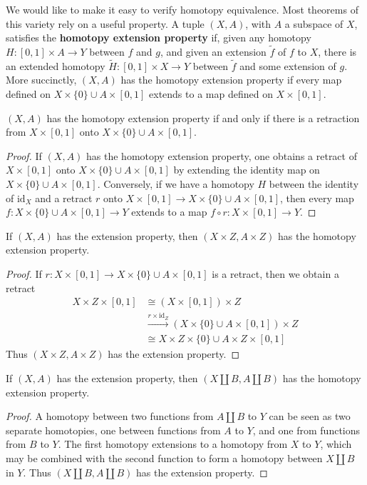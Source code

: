 We would like to make it easy to verify homotopy equivalence. Most theorems of this variety rely on a useful property. A tuple $(X,A)$, with $A$ a subspace of $X$, satisfies the {\bf homotopy extension property} if, given any homotopy $H: [0,1] \times A \to Y$ between $f$ and $g$, and given an extension $\tilde{f}$ of $f$ to $X$, there is an extended homotopy $\widetilde{H}: [0,1] \times X \to Y$ between $\tilde{f}$ and some extension of $g$. More succinctly, $(X,A)$ has the homotopy extension property if every map defined on $X \times \{ 0 \} \cup A \times [0,1]$ extends to a map defined on $X \times [0,1]$.

\begin{lemma}
    $(X,A)$ has the homotopy extension property if and only if there is a retraction from $X \times [0,1]$ onto $X \times \{ 0 \} \cup A \times [0,1]$.
\end{lemma}
\begin{proof}
    If $(X,A)$ has the homotopy extension property, one obtains a retract of $X \times [0,1]$ onto $X \times \{ 0 \} \cup A \times [0,1]$ by extending the identity map on $X \times \{ 0 \} \cup A \times [0,1]$. Conversely, if we have a homotopy $H$ between the identity of $\text{id}_X$ and a retract $r$ onto $X \times [0,1] \to X \times \{ 0 \} \cup A \times [0,1]$, then every map $f: X \times \{ 0 \} \cup A \times [0,1] \to Y$ extends to a map $f \circ r: X \times [0,1] \to Y$.
\end{proof}

\begin{corollary}
    If $(X,A)$ has the extension property, then $(X \times Z, A \times Z)$ has the homotopy extension property.
\end{corollary}
\begin{proof}
    If $r: X \times [0,1] \to X \times \{ 0 \} \cup A \times [0,1]$ is a retract, then we obtain a retract
    \begin{align*}
        X \times Z \times [0,1] &\cong (X \times [0,1]) \times Z\\
        &\xrightarrow{r \times \text{id}_Z} (X \times \{ 0 \} \cup A \times [0,1]) \times Z\\
        &\cong X \times Z \times \{ 0 \} \cup A \times Z \times [0,1]
    \end{align*}
    Thus $(X \times Z, A \times Z)$ has the extension property.
\end{proof}

\begin{corollary}
    If $(X,A)$ has the extension property, then $(X \coprod B, A \coprod B)$ has the homotopy extension property.
\end{corollary}
\begin{proof}
    A homotopy between two functions from $A \coprod B$ to $Y$ can be seen as two separate homotopies, one between functions from $A$ to $Y$, and one from functions from $B$ to $Y$. The first homotopy extensions to a homotopy from $X$ to $Y$, which may be combined with the second function to form a homotopy between $X \coprod B$ in $Y$. Thus $(X \coprod B, A \coprod B)$ has the extension property.
\end{proof}

